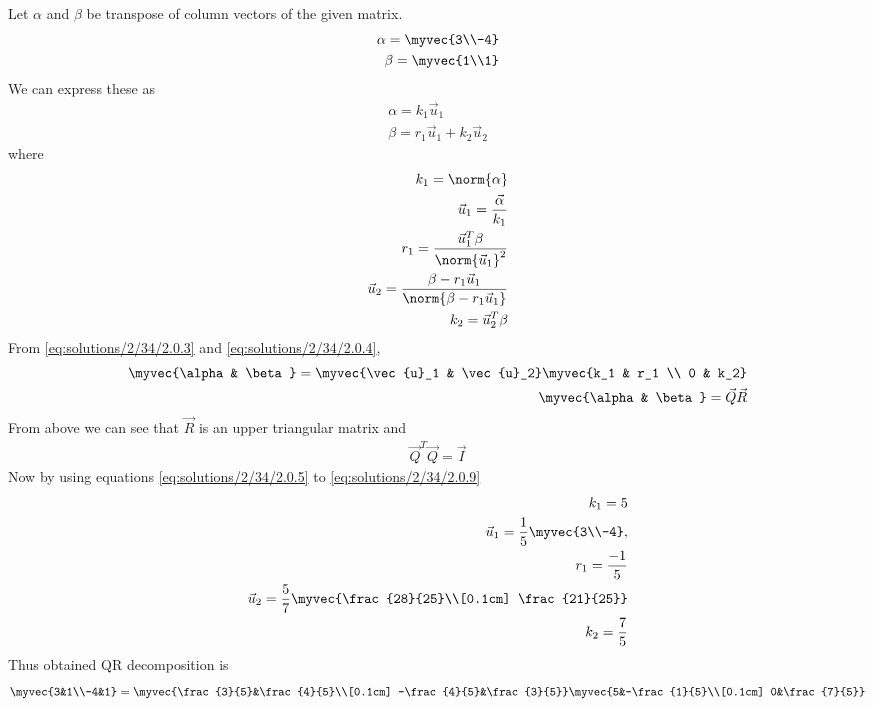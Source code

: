   Let $\alpha$ and $\beta$ be transpose of column vectors of the given matrix.
  \begin{align}
\alpha=\myvec{3\\-4}\\
\beta=\myvec{1\\1}
\end{align}
We can express these as
\begin{align}
\alpha=k_1\vec{u}_1\label{eq:solutions/2/34/2.0.3}\\
\beta=r_1\vec{u}_1+k_2\vec{u}_2\label{eq:solutions/2/34/2.0.4}
\end{align}
where 
\begin{align}
k_1 = \norm{\alpha}\label{eq:solutions/2/34/2.0.5}\\\vec{u}_1 = \frac{\vec{\alpha}}{k_1} 
\\
r_1 = \frac{\vec{u}_1^T\beta}{\norm{\vec{u}_1}^2}\\
\vec{u}_2 = \frac{\beta - r_1 \vec{u}_1}{\norm{\beta - r_1 \vec{u}_1}}
\\
k_2 = {\vec{u}_2^T\beta}\label{eq:solutions/2/34/2.0.9}
\end{align}
From \eqref{eq:solutions/2/34/2.0.3} and \eqref{eq:solutions/2/34/2.0.4}, 
\begin{align}
\myvec{\alpha & \beta } = \myvec{\vec{u}_1 & \vec{u}_2}\myvec{k_1 & r_1 \\ 0 & k_2} \\
\myvec{\alpha & \beta } = \vec{Q}\vec{R}
\end{align}
From above we can see that $\vec{R}$ is an upper triangular matrix and
\begin{align}
\vec{Q}^T\vec{Q}=\vec{I}
\end{align}
Now by using equations \eqref{eq:solutions/2/34/2.0.5} to \eqref{eq:solutions/2/34/2.0.9} 
\begin{align}
k_1 =5\\ \vec{u}_1 = \frac{1}{5} \myvec{3\\-4},
\\
r_1 = \frac{-1}{5}\\ \vec{u}_2 = \frac{5}{7}\myvec{\frac{28}{25}\\[0.1cm] \frac{21}{25}}\\
k_2 = \frac{7}{5}
\end{align}
Thus obtained QR decomposition is
\begin{align}
\myvec{3&1\\-4&1}=\myvec{\frac{3}{5}&\frac{4}{5}\\[0.1cm]
-\frac{4}{5}&\frac{3}{5}}
\myvec{5&-\frac{1}{5}\\[0.1cm]
0&\frac{7}{5}}
\end{align}
